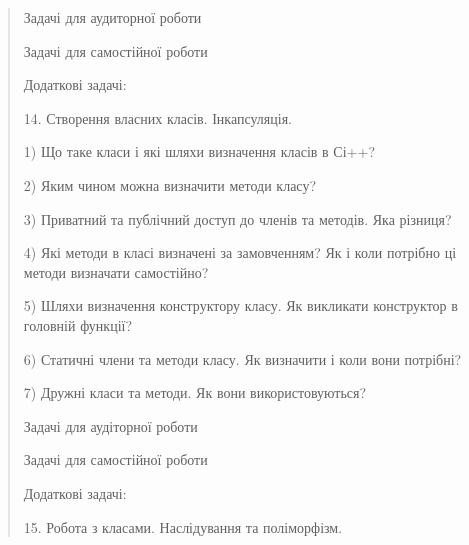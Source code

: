 \documentclass[]{article}
\begin{document}
\begin{quote}
Задачі для аудиторної роботи

Задачі для самостійної роботи

Додаткові задачі:

14. Створення власних класів. Інкапсуляція.

1) Що таке класи і які шляхи визначення класів в Сі++?

2) Яким чином можна визначити методи класу?

3) Приватний та публічний доступ до членів та методів. Яка різниця?

4) Які методи в класі визначені за замовченням? Як і коли потрібно ці
методи визначати самостійно?

5) Шляхи визначення конструктору класу. Як викликати конструктор в
головній функції?

6) Статичні члени та методи класу. Як визначити і коли вони потрібні?

7) Дружні класи та методи. Як вони використовуються?

Задачі для аудіторної роботи

Задачі для самостійної роботи

Додаткові задачі:

15. Робота з класами. Наслідування та поліморфізм.
\end{quote}
\end{document}
